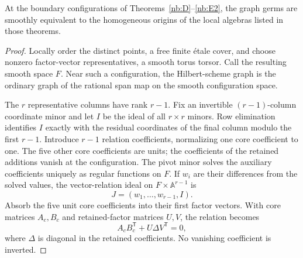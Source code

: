 \begin{lemma}\label{nb:charts}
At the boundary configurations of Theorems~\ref{nb:D}--\ref{nb:E2},
the graph germs are smoothly equivalent to the homogeneous origins
of the local algebras listed in those theorems.
\end{lemma}

\begin{proof}
Locally order the distinct points, a free finite \'etale cover, and
choose nonzero factor-vector representatives, a smooth torus torsor.
Call the resulting smooth space $F$. Near such a configuration, the
Hilbert-scheme graph is the ordinary graph of the rational span map
on the smooth configuration space.

The $r$ representative columns have rank $r-1$. Fix an invertible
$(r-1)$-column coordinate minor and let $I$ be the ideal of all
$r\times r$ minors. Row elimination identifies $I$ exactly with the
residual coordinates of the final column modulo the first $r-1$.
Introduce $r-1$ relation coefficients, normalizing one core coefficient
to one. The five other core coefficients are units; the coefficients
of the retained additions vanish at the configuration. The pivot
minor solves the auxiliary coefficients uniquely as regular functions
on $F$. If $w_i$ are their differences from the solved values, the
vector-relation ideal on $F\times\mathbb A^{r-1}$ is
\begin{equation}\label{nb:auxiliary}
 J=(w_1,\ldots,w_{r-1},I).
\end{equation}
Absorb the five unit core coefficients into their first factor vectors.
With core matrices $A_c,B_c$ and retained-factor matrices $U,V$, the
relation becomes
\begin{equation}\label{nb:relation}
 A_cB_c^{\mathsf T}+U\Delta V^{\mathsf T}=0,
\end{equation}
where $\Delta$ is diagonal in the retained coefficients. No vanishing
coefficient is inverted.


\end{proof}
